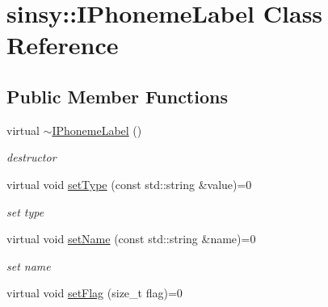 \hypertarget{classsinsy_1_1IPhonemeLabel}{\section{sinsy\-:\-:\-I\-Phoneme\-Label \-Class \-Reference}
\label{classsinsy_1_1IPhonemeLabel}
}
\subsection*{\-Public \-Member \-Functions}
\begin{DoxyCompactItemize}
\item 
\hypertarget{classsinsy_1_1IPhonemeLabel_a5f7b131285ecf6d9041617cc5c126814}{virtual \hyperlink{classsinsy_1_1IPhonemeLabel_a5f7b131285ecf6d9041617cc5c126814}{$\sim$\-I\-Phoneme\-Label} ()}\label{classsinsy_1_1IPhonemeLabel_a5f7b131285ecf6d9041617cc5c126814}

\begin{DoxyCompactList}\small\item\em destructor \end{DoxyCompactList}\item 
\hypertarget{classsinsy_1_1IPhonemeLabel_a83ec4ed831f7d685bbd13c136d4bee85}{virtual void \hyperlink{classsinsy_1_1IPhonemeLabel_a83ec4ed831f7d685bbd13c136d4bee85}{set\-Type} (const std\-::string \&value)=0}\label{classsinsy_1_1IPhonemeLabel_a83ec4ed831f7d685bbd13c136d4bee85}

\begin{DoxyCompactList}\small\item\em set type \end{DoxyCompactList}\item 
\hypertarget{classsinsy_1_1IPhonemeLabel_a5b39af1d297171b914c5f0c8114c28d4}{virtual void \hyperlink{classsinsy_1_1IPhonemeLabel_a5b39af1d297171b914c5f0c8114c28d4}{set\-Name} (const std\-::string \&name)=0}\label{classsinsy_1_1IPhonemeLabel_a5b39af1d297171b914c5f0c8114c28d4}

\begin{DoxyCompactList}\small\item\em set name \end{DoxyCompactList}\item 
\hypertarget{classsinsy_1_1IPhonemeLabel_a7de966d57f1fd1f16af79382f05c2d42}{virtual void \hyperlink{classsinsy_1_1IPhonemeLabel_a7de966d57f1fd1f16af79382f05c2d42}{set\-Flag} (size\-\_\-t flag)=0}\label{classsinsy_1_1IPhonemeLabel_a7de966d57f1fd1f16af79382f05c2d42}


\end{DoxyCompactItemize}
